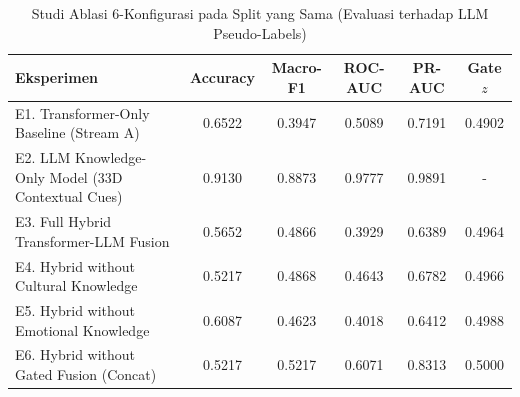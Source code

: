 \begin{table}[htbp]
\centering
\caption{Studi Ablasi 6-Konfigurasi pada Split yang Sama (Evaluasi terhadap LLM Pseudo-Labels)}
\label{tab:ablation_study}
\begin{tabular}{lccccc}
\hline
\textbf{Eksperimen} & \textbf{Accuracy} & \textbf{Macro-F1} & \textbf{ROC-AUC} & \textbf{PR-AUC} & \textbf{Gate $z$} \\
\hline
E1. Transformer-Only Baseline (Stream A) & 0.6522 & 0.3947 & 0.5089 & 0.7191 & 0.4902 \\
E2. LLM Knowledge-Only Model (33D Contextual Cues) & 0.9130 & 0.8873 & 0.9777 & 0.9891 & - \\
E3. Full Hybrid Transformer-LLM Fusion & 0.5652 & 0.4866 & 0.3929 & 0.6389 & 0.4964 \\
E4. Hybrid without Cultural Knowledge & 0.5217 & 0.4868 & 0.4643 & 0.6782 & 0.4966 \\
E5. Hybrid without Emotional Knowledge & 0.6087 & 0.4623 & 0.4018 & 0.6412 & 0.4988 \\
E6. Hybrid without Gated Fusion (Concat) & 0.5217 & 0.5217 & 0.6071 & 0.8313 & 0.5000 \\
\hline
\end{tabular}
\end{table}
